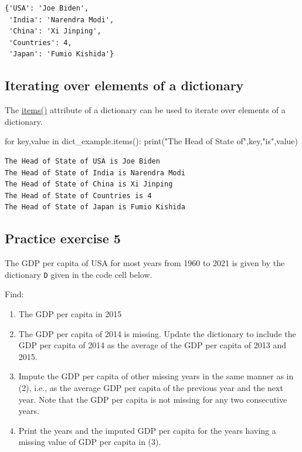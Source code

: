 \documentclass[
  letterpaper,
  DIV=11,
  numbers=noendperiod]{scrreprt}
\newenvironment{Shaded}{\begin{snugshade}}{\end{snugshade}}
\newcommand{\BuiltInTok}[1]{\textcolor[rgb]{0.00,0.23,0.31}{#1}}
\newcommand{\ControlFlowTok}[1]{\textcolor[rgb]{0.00,0.23,0.31}{#1}}
\newcommand{\KeywordTok}[1]{\textcolor[rgb]{0.00,0.23,0.31}{#1}}
\newcommand{\NormalTok}[1]{\textcolor[rgb]{0.00,0.23,0.31}{#1}}
\newcommand{\StringTok}[1]{\textcolor[rgb]{0.13,0.47,0.30}{#1}}
\providecommand{\tightlist}{%
  \setlength{\itemsep}{0pt}\setlength{\parskip}{0pt}}\usepackage{longtable,booktabs,array}
\begin{document}
\begin{verbatim}
{'USA': 'Joe Biden',
 'India': 'Narendra Modi',
 'China': 'Xi Jinping',
 'Countries': 4,
 'Japan': 'Fumio Kishida'}
\end{verbatim}

\hypertarget{iterating-over-elements-of-a-dictionary}{%
\subsection{Iterating over elements of a
dictionary}\label{iterating-over-elements-of-a-dictionary}}

The
\href{https://docs.python.org/3/tutorial/datastructures.html\#looping-techniques}{items()}
attribute of a dictionary can be used to iterate over elements of a
dictionary.

\begin{Shaded}
\begin{Highlighting}[]
\ControlFlowTok{for}\NormalTok{ key,value }\KeywordTok{in}\NormalTok{ dict\_example.items():}
    \BuiltInTok{print}\NormalTok{(}\StringTok{"The Head of State of"}\NormalTok{,key,}\StringTok{"is"}\NormalTok{,value)}
\end{Highlighting}
\end{Shaded}

\begin{verbatim}
The Head of State of USA is Joe Biden
The Head of State of India is Narendra Modi
The Head of State of China is Xi Jinping
The Head of State of Countries is 4
The Head of State of Japan is Fumio Kishida
\end{verbatim}

\hypertarget{practice-exercise-5-2}{%
\subsection{Practice exercise 5}\label{practice-exercise-5-2}}

The GDP per capita of USA for most years from 1960 to 2021 is given by
the dictionary \texttt{D} given in the code cell below.

Find:

\begin{enumerate}
\def\labelenumi{\arabic{enumi}.}
\tightlist
\item
  The GDP per capita in 2015
\item
  The GDP per capita of 2014 is missing. Update the dictionary to
  include the GDP per capita of 2014 as the average of the GDP per
  capita of 2013 and 2015.
\item
  Impute the GDP per capita of other missing years in the same manner as
  in (2), i.e., as the average GDP per capita of the previous year and
  the next year. Note that the GDP per capita is not missing for any two
  consecutive years.
\item
  Print the years and the imputed GDP per capita for the years having a
  missing value of GDP per capita in (3).
\end{enumerate}
\end{document}
